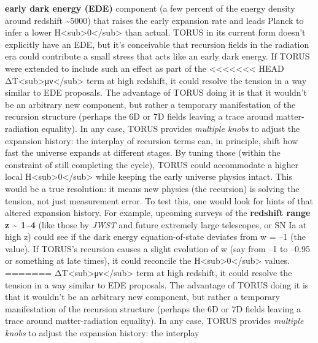 \documentclass[]{article}
\begin{document}
\begin{enumerate}
  \textbf{early dark energy (EDE)} component (a few percent of the
  energy density around redshift \textasciitilde{}5000) that raises the
  early expansion rate and leads Planck to infer a lower
  H\textless{}sub\textgreater{}0\textless{}/sub\textgreater{} than
  actual. TORUS in its current form doesn't explicitly have an EDE, but
  it's conceivable that recursion fields in the radiation era could
  contribute a small stress that acts like an early dark energy. If
  TORUS were extended to include such an effect as part of the
<<<<<<< HEAD
  ΔT\textless sub\textgreater μν\textless/sub\textgreater{} term at high
  redshift, it could resolve the tension in a way similar to EDE
  proposals\hspace{0pt}. The advantage of TORUS doing it is that it
  wouldn't be an arbitrary new component, but rather a temporary
  manifestation of the recursion structure (perhaps the 6D or 7D fields
  leaving a trace around matter-radiation equality). In any case, TORUS
  provides \emph{multiple knobs} to adjust the expansion history: the
  interplay of recursion terms can, in principle, shift how fast the
  universe expands at different stages. By tuning those (within the
  constraint of still completing the cycle), TORUS could accommodate a
  higher local H\textless sub\textgreater0\textless/sub\textgreater{}
  while keeping the early universe physics intact\hspace{0pt}. This
  would be a true resolution: it means new physics (the recursion) is
  solving the tension, not just measurement error. To test this, one
  would look for hints of that altered expansion history. For example,
  upcoming surveys of the \textbf{redshift range z \textasciitilde{}
  1--4} (like those by \emph{JWST} and future extremely large
  telescopes, or SN Ia at high z) could see if the dark energy
  equation-of-state deviates from w = --1 (the \LambdaCDM value). If TORUS's
  recursion causes a slight evolution of w (say from --1 to --0.95 or
  something at late times), it could reconcile the
  H\textless sub\textgreater0\textless/sub\textgreater{} values.
=======
  ΔT\textless{}sub\textgreater{}μν\textless{}/sub\textgreater{} term at
  high redshift, it could resolve the tension in a way similar to EDE
  proposals​. The advantage of TORUS doing it is that it wouldn't be an
  arbitrary new component, but rather a temporary manifestation of the
  recursion structure (perhaps the 6D or 7D fields leaving a trace
  around matter-radiation equality). In any case, TORUS provides
  \emph{multiple knobs} to adjust the expansion history: the interplay

\end{enumerate}
\end{document}
